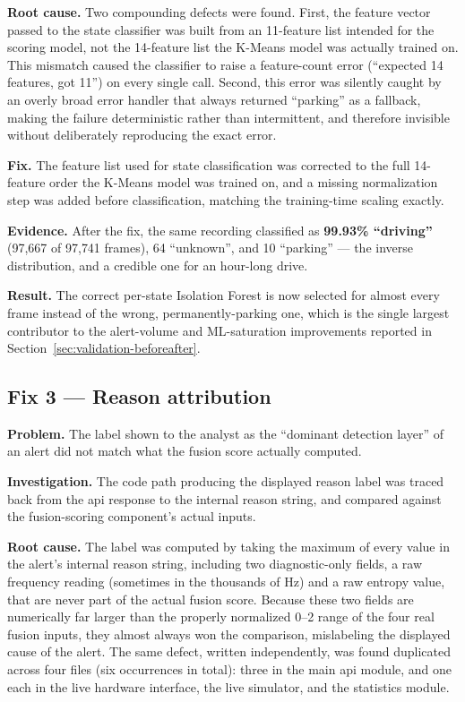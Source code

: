 \textbf{Root cause.} Two compounding defects were found. First, the feature vector passed to the state classifier was built from an 11-feature list intended for the scoring model, not the 14-feature list the K-Means model was actually trained on. This mismatch caused the classifier to raise a feature-count error (``expected 14 features, got 11'') on every single call. Second, this error was silently caught by an overly broad error handler that always returned ``parking'' as a fallback, making the failure deterministic rather than intermittent, and therefore invisible without deliberately reproducing the exact error.

\textbf{Fix.} The feature list used for state classification was corrected to the full 14-feature order the K-Means model was trained on, and a missing normalization step was added before classification, matching the training-time scaling exactly.

\textbf{Evidence.} After the fix, the same recording classified as \textbf{99.93\% ``driving''} (97{,}667 of 97{,}741 frames), 64 ``unknown'', and 10 ``parking'' — the inverse distribution, and a credible one for an hour-long drive.

\textbf{Result.} The correct per-state Isolation Forest is now selected for almost every frame instead of the wrong, permanently-parking one, which is the single largest contributor to the alert-volume and ML-saturation improvements reported in Section~\ref{sec:validation-beforeafter}.

\subsection{Fix 3 — Reason attribution}

\textbf{Problem.} The label shown to the analyst as the ``dominant detection layer'' of an alert did not match what the fusion score actually computed.

\textbf{Investigation.} The code path producing the displayed reason label was traced back from the \gls{api} response to the internal reason string, and compared against the fusion-scoring component's actual inputs.

\textbf{Root cause.} The label was computed by taking the maximum of every value in the alert's internal reason string, including two diagnostic-only fields, a raw frequency reading (sometimes in the thousands of Hz) and a raw entropy value, that are never part of the actual fusion score. Because these two fields are numerically far larger than the properly normalized 0--2 range of the four real fusion inputs, they almost always won the comparison, mislabeling the displayed cause of the alert. The same defect, written independently, was found duplicated across four files (six occurrences in total): three in the main \gls{api} module, and one each in the live hardware interface, the live simulator, and the statistics module.

